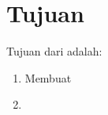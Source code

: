 \section{Tujuan}
\label{sec:Tujuan}

Tujuan dari \lipsum[1][1-3] adalah:

\begin{enumerate}[nolistsep]

  \item Membuat \lipsum[2][1-3]

  \item \lipsum[3][1-3]

\end{enumerate}
